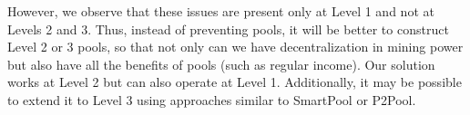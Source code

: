 \documentclass[11pt]{article}
\newcommand{\authnote}[2]{\marginpar{\parbox{\marginparwidth}{\tiny %
  \textsf{#1 {\textcolor{blue}{notes: #2}}}}}%
  \textcolor{blue}{\textbf{\dag}}}
\newcommand{\authnote}[2]{
  \textsf{#1 \textcolor{blue}{: #2}}}
\newcommand{\authnote}[2]{}
\newcommand{\snote}[1]{{\authnote{\textcolor{red}{Scalahub notes}}{#1}}}
\newcommand{\langname}{ErgoScript\xspace}
\newcommand{\poolname}{ErgoPool\xspace}
\begin{document}
However, we observe that these issues are present only at Level 1 and not at Levels 2 and 3. Thus, instead of preventing pools, it will be better to construct Level 2 or 3 pools, so that not only can we have decentralization in mining power but also have all the benefits of pools (such as regular income). Our solution works at Level 2 but can also operate at Level 1. Additionally, it may be possible to extend it to Level 3 using approaches similar to SmartPool or P2Pool.







\end{document}
